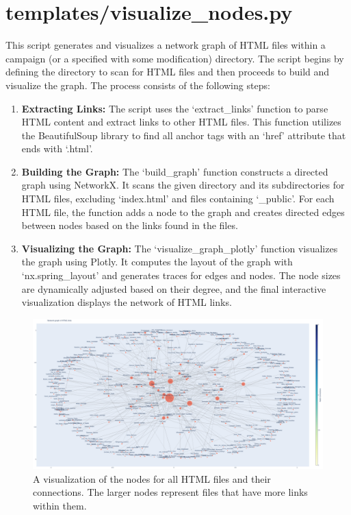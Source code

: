 \section{templates/visualize\_nodes.py}

This script generates and visualizes a network graph of HTML files within a campaign (or a specified with some modification) directory. The script begins by defining the directory to scan for HTML files and then proceeds to build and visualize the graph. The process consists of the following steps:

\begin{enumerate}
    \item \textbf{Extracting Links:} The script uses the `extract\_links' function to parse HTML content and extract links to other HTML files. This function utilizes the BeautifulSoup library to find all anchor tags with an `href' attribute that ends with `.html'.
    
    \item \textbf{Building the Graph:} The `build\_graph' function constructs a directed graph using NetworkX. It scans the given directory and its subdirectories for HTML files, excluding `index.html' and files containing `\_public'. For each HTML file, the function adds a node to the graph and creates directed edges between nodes based on the links found in the files.
    
    \item \textbf{Visualizing the Graph:} The `visualize\_graph\_plotly' function visualizes the graph using Plotly. It computes the layout of the graph with `nx.spring\_layout' and generates traces for edges and nodes. The node sizes are dynamically adjusted based on their degree, and the final interactive visualization displays the network of HTML links.
\end{enumerate}

\begin{figure}[h]
	\centering
	\includegraphics[width=\textwidth]{images/node_visualization.png}
	\caption{A visualization of the nodes for all HTML files and their connections. The larger nodes represent files that have more links within them.}
	\label{fig:node_visualization}
\end{figure}








